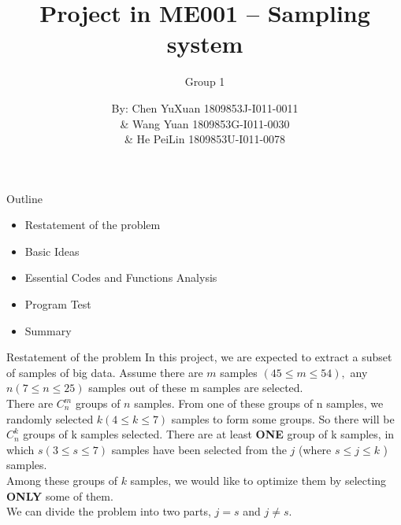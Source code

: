 \documentclass[hyperref={pdfpagelabels=false}]{beamer}
\title{Project in ME001 -- Sampling system}
\author[Maxwell]{Group 1}
\date{
By: Chen YuXuan 1809853J-I011-0011\\
\&   Wang Yuan 1809853G-I011-0030\\
\& He PeiLin 1809853U-I011-0078 
}
\begin{document}
\maketitle

\begin{frame}{Outline}
    \begin{itemize}
        \item Restatement of the problem
        \item Basic Ideas
        \item Essential Codes and Functions Analysis
        \item Program Test
        \item Summary
    \end{itemize}
\end{frame}

\begin{frame}{Restatement of the problem}
In this project, we are expected to extract a subset of samples of big data. Assume there are $m$ samples $(45 \leq m \leq 54),$ any $n(7 \leq n \leq 25)$ samples out of these m samples are selected.\\
There are $C_{n}^{m}$ groups of $n$ samples. From one of these groups of n samples, we randomly selected $k(4 \leq k \leq 7)$ samples to form some groups. So there will be $C_{n}^{k}$ groups of k samples selected. There are at least \textbf{ONE} group of k samples, in which $s(3 \leq s \leq 7)$ samples have been selected from the $j$ (where $s \leq j \leq k$ ) samples.\\
Among these groups of $k$ samples, we would like to optimize them by selecting \textbf{ONLY} some of them.\\
We can divide the problem into two parts, $j=s$ and $j \neq s$.
\end{frame}
\end{document}
